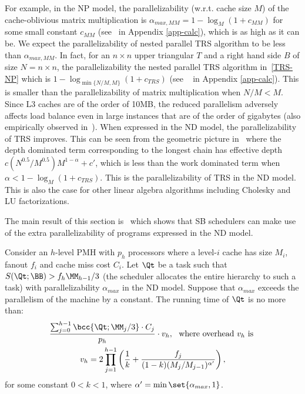 For example, in the NP model, the parallelizability (w.r.t. cache size
$M$) of the cache-oblivious matrix multiplication is $\alpha_{max,MM}
= 1-\log_{M}(1+c_{MM})$ for some small constant $c_{MM}$
(see~ in Appendix \ref{app-calc}), which is as high as
it can be. We expect the parallelizability of nested parallel TRS
algorithm to be less than $\alpha_{max,MM}$. In fact, for an $n\times
n$ upper triangular $T$ and a right hand side $B$ of size $N = n\times
n$, the parallelizability the nested parallel TRS algorithm
in~\eqref{TRS-NP} which is $1-\log_{\min\{N/M,M\}}(1+c_{TRS})$ (see
~ in Appendix \ref{app-calc}). This is smaller than the
parallelizability of matrix multiplication when $N/M < M$. Since L3
caches are of the order of 10MB, the reduced parallelism adversely
affects load balance even in large instances that are of the order of
gigabytes (also empirically observed in~\cite{SimhadriBlFi15}).  When
expressed in the ND model, the parallelizability of TRS improves.
This can be seen from the geometric picture
in~ where the depth dominated term
corresponding to the longest chain has effective depth
$c(N^{0.5}/M^{0.5})M^{1-\alpha} + c'$, which is less than the work
dominated term when $\alpha < 1-\log_{M}(1+c_{TRS})$.  This is the
parallelizability of TRS in the ND model.  This is also the case for
other linear algebra algorithms including Cholesky and LU
factorizations.

\vspace{3pt}
The main result of this section is~ which shows
that SB schedulers can make use of the extra parallelizability of
programs expressed in the ND model.
\begin{theorem}
\vspace{-3pt}
Consider an $h$-level PMH with $p_h$ processors where a level-$i$ cache
has size $M_i$, fanout $f_i$ and cache miss cost $C_i$. Let $\Qt$ be a
task such that $S(\Qt;\BB)>f_h\MM_{h-1}/3$ (the scheduler allocates the
entire hierarchy to such a task) with parallelizability $\alpha_{max}$
in the ND model. Suppose that $\alpha_{max}$ exceeds the parallelism
of the machine by a constant. The running time of $\Qt$ is no more than:
\begin{multline*}
  \frac{\sum_{j=0}^{h-1} \bcc{\Qt; \MM_j/3}\cdot C_j}{p_h}\cdot v_h,
  \ \ \textrm{where overhead}\ v_h\ \textrm{is}\ \\ 
  v_h=2\prod_{j=1}^{h-1} \left(\frac{1}{k} +
    \frac{f_j}{(1-k)(M_j/M_{j-1})^{\alpha'}}\right),
\end{multline*}
for some constant $0<k<1$, where $\alpha' = \min\set{\alpha_{max},1}$.
\label{thm:rt}
\end{theorem}

